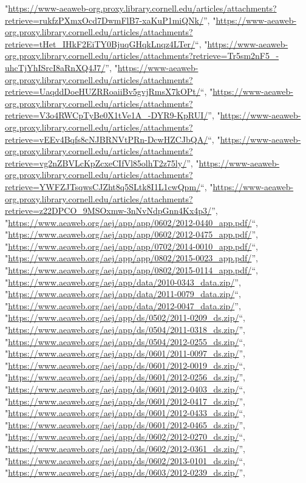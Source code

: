 \documentclass[]{article}
\begin{document}
\begin{itemize}
  "\url{https://www-aeaweb-org.proxy.library.cornell.edu/articles/attachments?retrieve=rukfzPXmxOcd7DwmFlB7-xaKuP1miQNk/}'',
  "\url{https://www-aeaweb-org.proxy.library.cornell.edu/articles/attachments?retrieve=tHet_IHkF2EiTY0BjuqGHqkLnqz4LTer/}``,
  "\url{https://www-aeaweb-org.proxy.library.cornell.edu/articles/attachments?retrieve=Tr5sm2nF5_-uhcTjYhISrcI8aRnXQ4J7/}'',
  "\url{https://www-aeaweb-org.proxy.library.cornell.edu/articles/attachments?retrieve=UaqddDoeHUZRRoaiiBv5gvjRmsX7kOPt/}``,
  "\url{https://www-aeaweb-org.proxy.library.cornell.edu/articles/attachments?retrieve=V3o4RWCpTyBe0X1tVe1A_-DYR9-KpRUI/}'',
  "\url{https://www-aeaweb-org.proxy.library.cornell.edu/articles/attachments?retrieve=vEEv4Bqfs8cNJBRNVtPRn-DcwHZCJbQA/}``,
  "\url{https://www-aeaweb-org.proxy.library.cornell.edu/articles/attachments?retrieve=vg2nZBVLcKpZcxeCIfVl85olhT2z75ly/}'',
  "\url{https://www-aeaweb-org.proxy.library.cornell.edu/articles/attachments?retrieve=YWFZJTsqwsCJZht8q5SLtk8I1L1cwQpm/}``,
  "\url{https://www-aeaweb-org.proxy.library.cornell.edu/articles/attachments?retrieve=z22DPCO_9MSOxmw-3nNvNdpGnn4Kx4p3/}'',
  "\url{https://www.aeaweb.org/aej/app/app/0602/2012-0440_app.pdf/}``,
  "\url{https://www.aeaweb.org/aej/app/app/0602/2012-0475_app.pdf/}'',
  "\url{https://www.aeaweb.org/aej/app/app/0702/2014-0010_app.pdf/}``,
  "\url{https://www.aeaweb.org/aej/app/app/0802/2015-0023_app.pdf/}'',
  "\url{https://www.aeaweb.org/aej/app/app/0802/2015-0114_app.pdf/}``,
  "\url{https://www.aeaweb.org/aej/app/data/2010-0343_data.zip/}'',
  "\url{https://www.aeaweb.org/aej/app/data/2011-0079_data.zip/}``,
  "\url{https://www.aeaweb.org/aej/app/data/2012-0047_data.zip/}'',
  "\url{https://www.aeaweb.org/aej/app/ds/0502/2011-0209_ds.zip/}``,
  "\url{https://www.aeaweb.org/aej/app/ds/0504/2011-0318_ds.zip/}'',
  "\url{https://www.aeaweb.org/aej/app/ds/0504/2012-0255_ds.zip/}``,
  "\url{https://www.aeaweb.org/aej/app/ds/0601/2011-0097_ds.zip/}'',
  "\url{https://www.aeaweb.org/aej/app/ds/0601/2012-0019_ds.zip/}``,
  "\url{https://www.aeaweb.org/aej/app/ds/0601/2012-0256_ds.zip/}'',
  "\url{https://www.aeaweb.org/aej/app/ds/0601/2012-0403_ds.zip/}``,
  "\url{https://www.aeaweb.org/aej/app/ds/0601/2012-0417_ds.zip/}'',
  "\url{https://www.aeaweb.org/aej/app/ds/0601/2012-0433_ds.zip/}``,
  "\url{https://www.aeaweb.org/aej/app/ds/0601/2012-0465_ds.zip/}'',
  "\url{https://www.aeaweb.org/aej/app/ds/0602/2012-0270_ds.zip/}``,
  "\url{https://www.aeaweb.org/aej/app/ds/0602/2012-0361_ds.zip/}'',
  "\url{https://www.aeaweb.org/aej/app/ds/0602/2013-0101_ds.zip/}``,
  "\url{https://www.aeaweb.org/aej/app/ds/0603/2012-0239_ds.zip/}'',

\end{itemize}
\end{document}
